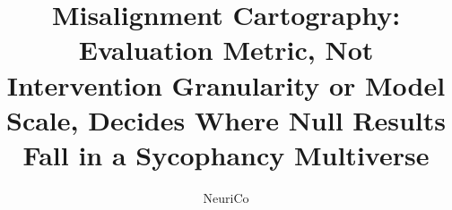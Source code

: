 \documentclass{article}
\title{Misalignment Cartography: Evaluation Metric, Not Intervention Granularity or Model Scale, Decides Where Null Results Fall in a Sycophancy Multiverse}
\author{NeuriCo}
\begin{document}
\maketitle

\begin{abstract}

\end{abstract}










\appendix

\end{document}
